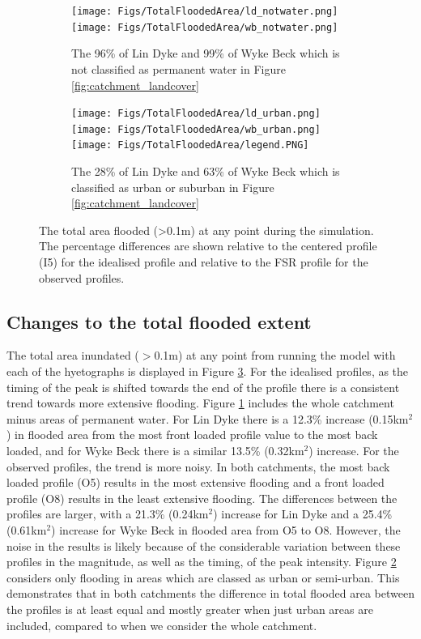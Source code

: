 \documentclass[APA,Times2COL]{WileyNJDv5}
\begin{document}
\begin{figure}[!t]
    \begin{subfigure}[b]{\textwidth}
        \centering
        \texttt{[image: Figs/TotalFloodedArea/ld\_notwater.png]}%
        \texttt{[image: Figs/TotalFloodedArea/wb\_notwater.png]}
   \caption{The 96\% of Lin Dyke and 99\% of Wyke Beck which is not 
 classified as permanent water in Figure \ref{fig:catchment_landcover}}\label{fig:total_flooded_area_notwater}
    \end{subfigure}
    \begin{subfigure}[b]{\textwidth}
        \centering
        \texttt{[image: Figs/TotalFloodedArea/ld\_urban.png]}%
        \texttt{[image: Figs/TotalFloodedArea/wb\_urban.png]}
        \raggedleft
        \texttt{[image: Figs/TotalFloodedArea/legend.PNG]}
   \caption{The 28\% of Lin Dyke and 63\% of Wyke Beck which is  
 classified as urban or suburban in Figure \ref{fig:catchment_landcover}}\label{fig:total_flooded_area_urban}
    \end{subfigure}
\caption{The total area flooded (\textgreater 0.1m) at any point during the simulation. The percentage differences are shown relative to the centered profile (I5) for the idealised profile and relative to the FSR profile for the observed profiles.} \label{fig:total_flooded_area} 
\end{figure}

\subsection{Changes to the total flooded extent}\label{subsec:model}

The total area inundated ($>$0.1m) at any point from running the model with each of the hyetographs is displayed in Figure \ref{fig:total_flooded_area}. For the idealised profiles, as the timing of the peak is shifted towards the end of the profile there is a consistent trend towards more extensive flooding. Figure \ref{fig:total_flooded_area_notwater} includes the whole catchment minus areas of permanent water. For Lin Dyke there is a 12.3\% increase (0.15km$^2$) in flooded area from the most front loaded profile value to the most back loaded, and for Wyke Beck there is a similar 13.5\% (0.32km$^2$) increase. For the observed profiles, the trend is more noisy. In both catchments, the most back loaded profile (O5) results in the most extensive flooding and a front loaded profile (O8) results in the least extensive flooding. The differences between the profiles are larger, with a 21.3\% (0.24km$^2$) increase for Lin Dyke and a 25.4\% (0.61km$^2$) increase for Wyke Beck in flooded area from O5 to O8. However, the noise in the results is likely because of the considerable variation between these profiles in the magnitude, as well as the timing, of the peak intensity. Figure \ref{fig:total_flooded_area_urban} considers only flooding in areas which are classed as urban or semi-urban. This demonstrates that in both catchments the difference in total flooded area between the profiles is at least equal and mostly greater when just urban areas are included, compared to when we consider the whole catchment. 
\end{document}
